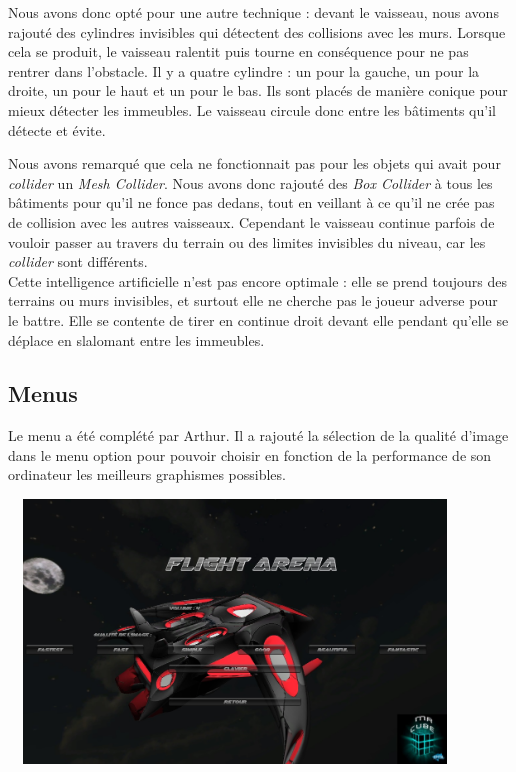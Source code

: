 \documentclass[10pt, titlepage]{report}
\begin{document}
Nous avons donc opté pour une autre technique : devant le vaisseau, nous avons rajouté des cylindres invisibles qui détectent des collisions avec les murs. Lorsque cela se produit, le vaisseau ralentit puis tourne en conséquence pour ne pas rentrer dans l'obstacle. Il y a quatre cylindre : un pour la gauche, un pour la droite, un pour le haut et un pour le bas. Ils sont placés de manière conique pour mieux détecter les immeubles. Le vaisseau circule donc entre les bâtiments qu'il détecte et évite.

Nous avons remarqué que cela ne fonctionnait pas pour les objets qui avait pour \textit{collider} un\textit{ Mesh Collider}. Nous avons donc rajouté des \textit{Box Collider} à tous les bâtiments pour qu'il ne fonce pas dedans, tout en veillant à ce qu'il ne crée pas de collision avec les autres vaisseaux. Cependant le vaisseau continue parfois de vouloir passer au travers du terrain ou des limites invisibles du niveau, car les \textit{collider} sont différents.\\

Cette intelligence artificielle n'est pas encore optimale : elle se prend toujours des terrains ou murs invisibles, et surtout elle ne cherche pas le joueur adverse pour le battre. Elle se contente de tirer en continue droit devant elle pendant qu'elle se déplace en slalomant entre les immeubles.\\

\subsection{Menus}

Le menu a été complété par Arthur. Il a rajouté la sélection de la qualité d'image dans le menu option pour pouvoir choisir en fonction de la performance de son ordinateur les meilleurs graphismes possibles.\\

\begin{center}
\includegraphics[height=7cm, width=12cm]{menu_option.jpg}
\end{center}
\end{document}
